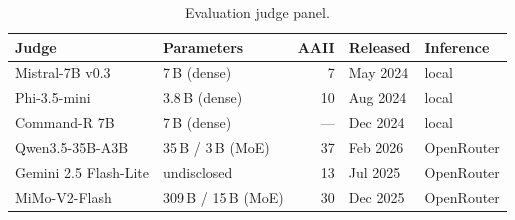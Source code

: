 \begin{table}[h]
  \centering\footnotesize
  \caption{Evaluation judge panel.}
  \label{tab:eval-judges}
  \begin{tabular}{llrll}
    \toprule
    Judge & Parameters & AAII & Released & Inference \\
    \midrule
    Mistral-7B v0.3 \citep{mistralaiMistral7BInstructV03}                & 7\,B (dense)         &  7 \citep{aaMistral7BInstruct}     & May 2024 & local      \\
    Phi-3.5-mini \citep{microsoftPhi35MiniInstruct}                      & 3.8\,B (dense)       & 10 \citep{aaPhi3Mini}              & Aug 2024 & local      \\
    Command-R 7B \citep{cohereCommandR7B}                                & 7\,B (dense)         & ---                                & Dec 2024 & local      \\
    Qwen3.5-35B-A3B \citep{qwenQwen3535BA3BCard}                         & 35\,B / 3\,B (MoE)   & 37 \citep{aaQwen3535BA3B}          & Feb 2026 & OpenRouter \\
    Gemini 2.5 Flash-Lite \citep{googleGemini25FlashLiteAnnounce}        & undisclosed          & 13 \citep{aaGemini25FlashLite}     & Jul 2025 & OpenRouter \\
    MiMo-V2-Flash \citep{xiaomiMimoV2FlashCard}                          & 309\,B / 15\,B (MoE) & 30 \citep{aaMimoV2Flash}           & Dec 2025 & OpenRouter \\
    \bottomrule
  \end{tabular}
\end{table}
